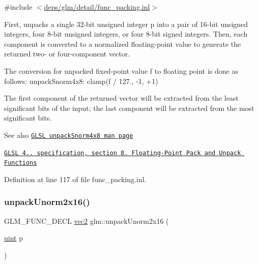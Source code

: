 {\ttfamily \#include $<$\hyperlink{func__packing_8inl}{deps/glm/detail/func\+\_\+packing.\+inl}$>$}

First, unpacks a single 32-\/bit unsigned integer p into a pair of 16-\/bit unsigned integers, four 8-\/bit unsigned integers, or four 8-\/bit signed integers. Then, each component is converted to a normalized floating-\/point value to generate the returned two-\/ or four-\/component vector.

The conversion for unpacked fixed-\/point value f to floating point is done as follows\+: unpack\+Snorm4x8\+: clamp(f / 127., -\/1, +1)

The first component of the returned vector will be extracted from the least significant bits of the input; the last component will be extracted from the most significant bits.

\begin{DoxySeeAlso}{See also}
\href{http://www.opengl.org/sdk/docs/manglsl/xhtml/unpackSnorm4x8.xml}{\tt G\+L\+SL unpack\+Snorm4x8 man page} 

\href{http://www.opengl.org/registry/doc/GLSLangSpec.4.20.8.pdf}{\tt G\+L\+SL 4.. specification, section 8. Floating-\/\+Point Pack and Unpack Functions} 
\end{DoxySeeAlso}


Definition at line 117 of file func\+\_\+packing.\+inl.

\mbox{\label{group__core__func__packing_ga1f66188e5d65afeb9ffba1ad971e4007}} 
\subsubsection{\texorpdfstring{unpack\+Unorm2x16()}{unpackUnorm2x16()}}
{\footnotesize\ttfamily G\+L\+M\+\_\+\+F\+U\+N\+C\+\_\+\+D\+E\+CL \hyperlink{group__core__types_gaa1618f51db67eaa145db101d8c8431d8}{vec2} glm\+::unpack\+Unorm2x16 (\begin{DoxyParamCaption}\item[{\hyperlink{group__core__precision_ga4fd29415871152bfb5abd588334147c8}{uint}}]{p }\end{DoxyParamCaption})}



